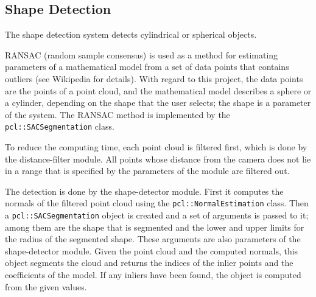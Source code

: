 \documentclass{article}
\newcommand{\code}[1]{\texttt{#1}}
\begin{document}
\subsection{Shape Detection}
\label{sec:shape_det}

The shape detection system detects cylindrical or spherical objects.

RANSAC (random sample consensus) is used as a method for estimating parameters
of a mathematical model from a set of data points that contains outliers (see
Wikipedia for details).
With regard to this project, the data points are the points of a point cloud,
and the mathematical model describes a sphere or a cylinder,
depending on the shape that the user selects; the shape is a parameter of the system.
The RANSAC method is implemented by the \code{pcl::SACSegmentation} class.

To reduce the computing time, each point cloud is filtered first, which is done by the
distance-filter module.
All points whose distance from the camera does not lie in a range that is specified by the
parameters of the module are filtered out.

The detection is done by the shape-detector module.
First it computes the normals of the filtered point cloud using the
\code{pcl::NormalEstimation} class.
Then a \code{pcl::SACSegmentation} object is created and a set of arguments is passed to it;
among them are the shape that is segmented
and the lower and upper limits for the radius of the segmented shape.
These arguments are also parameters of the shape-detector module.
Given the point cloud and the computed normals,
this object segments the cloud and returns the indices of the inlier points
and the coefficients of the model.
If any inliers have been found, the object is computed from the given values.


%
%
\end{document}
